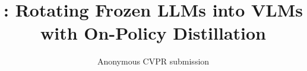 \documentclass[10pt,twocolumn,letterpaper]{article}
\title{\modelname: Rotating Frozen LLMs into VLMs with On-Policy Distillation}
\author{Anonymous CVPR submission}
\begin{document}
\maketitle
    





{
    \small
    
    
}


\end{document}
